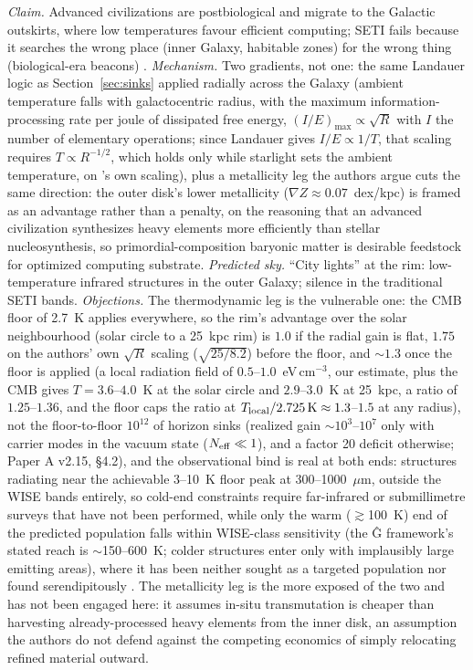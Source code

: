 \documentclass[11pt]{article}
\begin{document}
\emph{Claim.} Advanced civilizations are postbiological and migrate to the Galactic outskirts, where low temperatures favour efficient computing; SETI fails because it searches the wrong place (inner Galaxy, habitable zones) for the wrong thing (biological-era beacons) \citep{CirkovicBradbury2006}.
\emph{Mechanism.} Two gradients, not one: the same Landauer logic as Section~\ref{sec:sinks} applied radially across the Galaxy (ambient temperature falls with galactocentric radius, with the maximum information-processing rate per joule of dissipated free energy, $(I/E)_{\max}\propto\sqrt{R}$ with $I$ the number of elementary operations; since Landauer gives $I/E\propto1/T$, that scaling requires $T\propto R^{-1/2}$, which holds only while starlight sets the ambient temperature, on \citet{CirkovicBradbury2006}'s own scaling), plus a metallicity leg the authors argue cuts the same direction: the outer disk's lower metallicity ($\nabla Z \approx 0.07$~dex/kpc) is framed as an advantage rather than a penalty, on the reasoning that an advanced civilization synthesizes heavy elements more efficiently than stellar nucleosynthesis, so primordial-composition baryonic matter is desirable feedstock for optimized computing substrate.
\emph{Predicted sky.} ``City lights'' at the rim: low-temperature infrared structures in the outer Galaxy; silence in the traditional SETI bands.
\emph{Objections.} The thermodynamic leg is the vulnerable one: the CMB floor of 2.7~K applies everywhere, so the rim's advantage over the solar neighbourhood (solar circle to a 25~kpc rim) is $1.0$ if the radial gain is flat, $1.75$ on the authors' own $\sqrt{R}$ scaling ($\sqrt{25/8.2}$) before the floor, and $\sim1.3$ once the floor is applied (a local radiation field of $0.5$--$1.0$~eV\,cm$^{-3}$, our estimate, plus the CMB gives $T = 3.6$--$4.0$~K at the solar circle and $2.9$--$3.0$~K at 25~kpc, a ratio of $1.25$--$1.36$, and the floor caps the ratio at $T_{\rm local}/2.725\,{\rm K}\approx1.3$--$1.5$ at any radius), not the floor-to-floor $10^{12}$ of horizon sinks (realized gain $\sim 10^{3}$--$10^{7}$ only with carrier modes in the vacuum state ($N_{\rm eff}\ll1$), and a factor 20 deficit otherwise; Paper A v2.15, \S4.2), and the observational bind is real at both ends: structures radiating near the achievable 3--10~K floor peak at 300--1000~$\mu$m, outside the WISE bands entirely, so cold-end constraints require far-infrared or submillimetre surveys that have not been performed, while only the warm ($\gtrsim$100~K) end of the predicted population falls within WISE-class sensitivity (the \^G framework's stated reach is $\sim$150--600~K; colder structures enter only with implausibly large emitting areas), where it has been neither sought as a targeted population nor found serendipitously \citep{Wright2014b,Griffith2015}. The metallicity leg is the more exposed of the two and has not been engaged here: it assumes in-situ transmutation is cheaper than harvesting already-processed heavy elements from the inner disk, an assumption the authors do not defend against the competing economics of simply relocating refined material outward.
\end{document}
